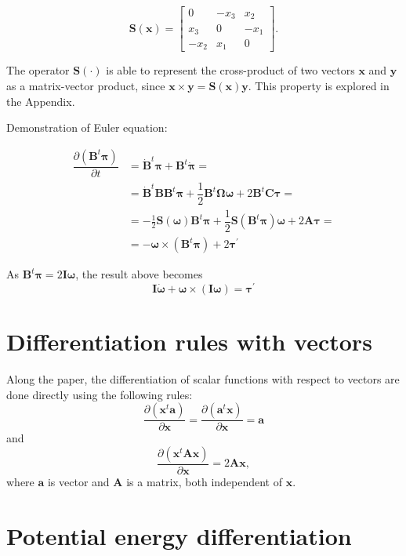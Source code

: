 \documentclass[aip,jcp,reprint,amsmath,amssymb,raggedbottom]{revtex4-1}
\newcommand{\mt}[1]{\boldsymbol{\mathbf{#1}}}           %
\newcommand{\vt}[1]{\boldsymbol{\mathbf{#1}}}           %
\newcommand{\tr}[1]{#1^t}                               %
\newcommand{\diff}[2]{\dfrac{\partial #1}{\partial #2}} %
\begin{document}
\begin{equation}
\label{eq:operator_S}
\mt S(\vt x) = \left[ \begin{array}{ccc}
0   & -x_3 &  x_2 \\
x_3 &  0   & -x_1 \\
-x_2 &  x_1 &  0
\end{array}\right].
\end{equation}

The operator  $\mt S(\cdot)$ is able to represent the cross-product of two vectors $\vt x$ and $\vt y$ as a matrix-vector product, since $\vt x \times \vt y = \mt S(\vt x)\vt y$. This property is explored in the Appendix.

Demonstration of Euler equation:

\begin{align*}
\diff{(\tr{\mt B}\vt \pi)}{t} &= \tr{\dot{\mt B}}\vt \pi + \tr{\mt B}\dot{\vt \pi} = \\
&=\tr{\dot{\mt B}}{\mt B}\tr{\mt B}{\vt \pi}  + \dfrac{1}{2} \tr{\mt B}\mt \Omega \vt \omega + 2 \tr{\mt B}\mt C \vt \tau = \\
&= -\frac{1}{2}{\mt S}(\vt \omega)\tr{\mt B}{\vt \pi} + \dfrac{1}{2} {\mt S}(\tr{\mt B}\mt \pi) \vt \omega + 2 \mt A \vt \tau = \\
&= - \vt \omega \times (\tr{\mt B}{\vt \pi}) + 2 {\vt \tau}^\prime
\end{align*}

As $\tr{\mt B}\vt \pi = 2 \mt I \vt \omega$, the result above becomes
\[
\mt I \dot{\vt \omega} + \vt \omega \times (\mt I \vt \omega) = {\vt \tau}^\prime
\]

\section{\label{sec:Diff_Rules}Differentiation rules with vectors}

Along the paper, the differentiation of scalar functions with respect to vectors are done directly using the following rules:
\[
\diff{(\tr{\vt x}\vt a)}{\vt x} = \diff{(\tr{\vt a}\vt x)}{\vt x} = \vt a
\]
and
\[
\diff{(\tr{\vt x}\mt A \vt x)}{\vt x} = 2 \mt A \vt x,
\]
where $\vt a$ is vector and $\mt A$ is a matrix, both independent of $\vt x$.

\section{\label{sec:Diff_PotEng}Potential energy differentiation}
\end{document}
